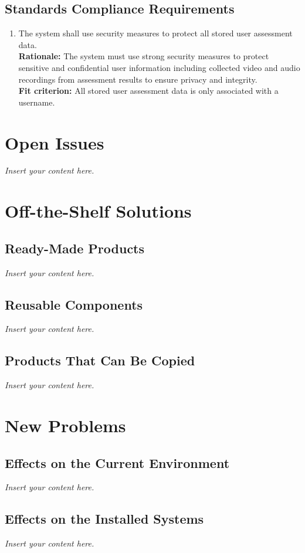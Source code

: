 \documentclass[12pt]{article}
\newcommand{\lips}{\textit{Insert your content here.}}
\begin{document}
\subsection{Standards Compliance Requirements}
\begin{enumerate}[{CR-STD}1. ]
  \item The system shall use security measures to protect all stored user assessment data.\\
  \textbf{Rationale: }The system must use strong security measures to protect sensitive and confidential user information including collected video and audio recordings from assessment results to ensure privacy and integrity.\\
  \textbf{Fit criterion: }All stored user assessment data is only associated with a username. 

\end{enumerate}

\section{Open Issues}
\lips

\section{Off-the-Shelf Solutions}
\subsection{Ready-Made Products}
\lips
\subsection{Reusable Components}
\lips
\subsection{Products That Can Be Copied}
\lips

\section{New Problems}
\subsection{Effects on the Current Environment}
\lips
\subsection{Effects on the Installed Systems}
\lips
\end{document}
